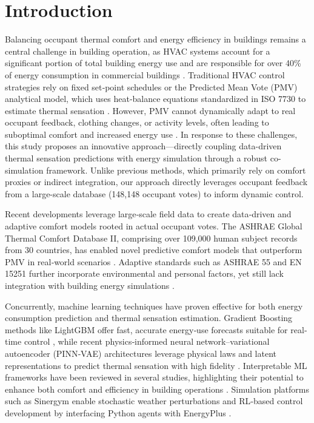 \section{Introduction}
Balancing occupant thermal comfort and energy efficiency in buildings remains a central challenge in building operation, as HVAC systems account for a significant portion of total building energy use and are responsible for over 40\% of energy consumption in commercial buildings \cite{Crawley2001}.  Traditional HVAC control strategies rely on fixed set‐point schedules or the Predicted Mean Vote (PMV) analytical model, which uses heat‐balance equations standardized in ISO 7730 to estimate thermal sensation \cite{Fanger1970}.  However, PMV cannot dynamically adapt to real occupant feedback, clothing changes, or activity levels, often leading to suboptimal comfort and increased energy use \cite{Schaudienst2017}. In response to these challenges, this study proposes an innovative approach—directly coupling data-driven thermal sensation predictions with energy simulation through a robust co-simulation framework. Unlike previous methods, which primarily rely on comfort proxies or indirect integration, our approach directly leverages occupant feedback from a large-scale database (148,148 occupant votes) to inform dynamic control.

Recent developments leverage large‐scale field data to create data‐driven and adaptive comfort models rooted in actual occupant votes.  The ASHRAE Global Thermal Comfort Database II, comprising over 109,000 human subject records from 30 countries, has enabled novel predictive comfort models that outperform PMV in real‐world scenarios \cite{Foldvary2018}.  Adaptive standards such as ASHRAE 55 and EN 15251 further incorporate environmental and personal factors, yet still lack integration with building energy simulations \cite{deDear2018}.  

Concurrently, machine learning techniques have proven effective for both energy consumption prediction and thermal sensation estimation.  Gradient Boosting methods like LightGBM offer fast, accurate energy‐use forecasts suitable for real‐time control \cite{Ke2017}, while recent physics‐informed neural network–variational autoencoder (PINN‐VAE) architectures leverage physical laws and latent representations to predict thermal sensation with high fidelity \cite{Chen2023}.  Interpretable ML frameworks have been reviewed in several studies, highlighting their potential to enhance both comfort and efficiency in building operations \cite{turn1search6}.  Simulation platforms such as Sinergym enable stochastic weather perturbations and RL‐based control development by interfacing Python agents with EnergyPlus \cite{perarnau2021sinergym, campoy2025sinergym}.  

